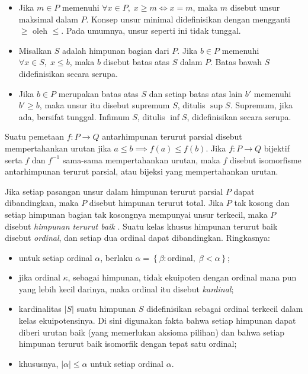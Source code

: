 \begin{itemize}
	\item Jika $m \in P$ memenuhi $\forall x \in P, \; x \geq m \iff x = m$,
	maka $m$ disebut unsur maksimal dalam $P$. Konsep unsur minimal didefinisikan
	dengan mengganti $\geq$ oleh $\leq$. Pada umumnya, unsur seperti ini tidak
	tunggal.
	\item Misalkan $S$ adalah himpunan bagian dari $P$. Jika $b \in P$ memenuhi
	$\forall x \in S, \; x \leq b$, maka $b$ disebut batas atas $S$ dalam $P$.
	Batas bawah $S$ didefinisikan secara serupa.
	\item Jika $b \in P$ merupakan batas atas $S$ dan setiap batas atas lain
	$b'$ memenuhi $b' \geq b$, maka unsur itu disebut supremum $S$, ditulis $\sup S$.
	Supremum, jika ada, bersifat tunggal. Infimum $S$, ditulis $\inf S$,
	didefinisikan secara serupa.
\end{itemize}

Suatu pemetaan $f: P \to Q$ antarhimpunan terurut parsial disebut
mempertahankan urutan jika
$a \leq b \implies f(a) \leq f(b)$. Jika $f: P \to Q$ bijektif serta $f$ dan
$f^{-1}$ sama-sama mempertahankan urutan, maka $f$ disebut isomorfisme
antarhimpunan terurut parsial, atau bijeksi yang mempertahankan urutan.

Jika setiap pasangan unsur dalam himpunan terurut parsial $P$ dapat dibandingkan,
maka $P$ disebut himpunan terurut total. Jika $P$ tak kosong dan setiap
himpunan bagian tak kosongnya mempunyai unsur terkecil, maka $P$
disebut \emph{himpunan terurut baik}
. Suatu kelas khusus himpunan
terurut baik disebut \emph{ordinal}, dan setiap dua
ordinal dapat dibandingkan. Ringkasnya:

\begin{itemize}
	\item untuk setiap ordinal $\alpha$, berlaku
	$\alpha = \left\{ \beta: \text{ordinal}, \; \beta < \alpha \right\}$;
	\item jika ordinal $\kappa$, sebagai himpunan, tidak ekuipoten dengan
	ordinal mana pun yang lebih kecil darinya, maka ordinal itu disebut
	\emph{kardinal};
	\item kardinalitas $|S|$ suatu himpunan $S$ didefinisikan sebagai ordinal
	terkecil dalam kelas ekuipotensinya. Di sini digunakan fakta bahwa setiap
	himpunan dapat diberi urutan baik (yang memerlukan aksioma pilihan) dan bahwa
	setiap himpunan terurut baik isomorfik dengan tepat satu ordinal;
	\item khususnya, $|\alpha| \leq \alpha$ untuk setiap ordinal $\alpha$.
\end{itemize}

